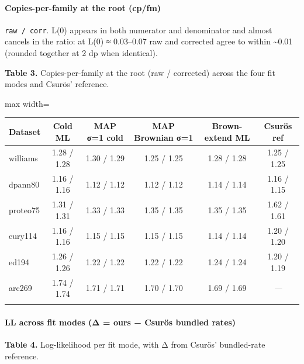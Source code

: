\documentclass[
  10pt,
]{article}
\begin{document}
\paragraph{Copies-per-family at the root
(cp/fm)}\label{copies-per-family-at-the-root-cpfm}

\texttt{raw\ /\ corr}. L(0) appears in both numerator and denominator
and almost cancels in the ratio: at L(0) ≈ 0.03--0.07 raw and corrected
agree to within \textasciitilde0.01 (rounded together at 2 dp when
identical).

\textbf{Table 3.} Copies-per-family at the root (raw / corrected) across
the four fit modes and Csurös' reference.

\begin{center}
\begin{adjustbox}{max width=\textwidth}
\begin{tabular}{@{}lccccc@{}}
\toprule\noalign{}
Dataset & Cold ML & MAP σ=1 cold & \textbf{MAP Brownian σ=1} &
\textbf{Brown-extend ML} & Csurös ref \\
\midrule\noalign{}
williams & 1.28 / 1.28 & 1.30 / 1.29 & 1.25 / 1.25 & 1.28 / 1.28 & 1.25
/ 1.25 \\
dpann80 & 1.16 / 1.16 & 1.12 / 1.12 & 1.12 / 1.12 & 1.14 / 1.14 & 1.16 /
1.15 \\
proteo75 & 1.31 / 1.31 & 1.33 / 1.33 & 1.35 / 1.35 & 1.35 / 1.35 & 1.62
/ 1.61 \\
eury114 & 1.16 / 1.16 & 1.15 / 1.15 & 1.15 / 1.15 & 1.14 / 1.14 & 1.20 /
1.20 \\
ed194 & 1.26 / 1.26 & 1.22 / 1.22 & 1.22 / 1.22 & 1.24 / 1.24 & 1.20 /
1.19 \\
arc269 & 1.74 / 1.74 & 1.71 / 1.71 & 1.70 / 1.70 & 1.69 / 1.69 &
\emph{---} \\
\bottomrule\noalign{}
\end{tabular}
\end{adjustbox}
\end{center}

\paragraph{LL across fit modes (Δ = ours − Csurös bundled
rates)}\label{ll-across-fit-modes-ux3b4--ours--csuruxf6s-bundled-rates}

\textbf{Table 4.} Log-likelihood per fit mode, with Δ from Csurös'
bundled-rate reference.
\end{document}
